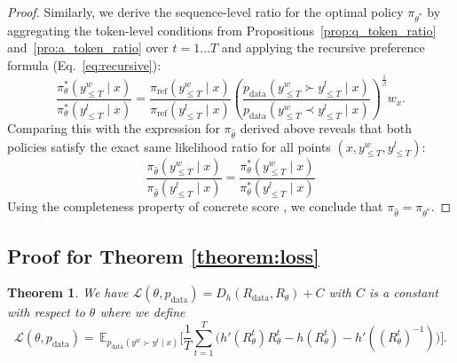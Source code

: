 \documentclass{article}
\theoremstyle{plain}
\newtheorem*{theorem*}{Theorem}
\theoremstyle{definition}
\theoremstyle{remark}
\begin{document}
\begin{proof}
Similarly, we derive the sequence-level ratio for the optimal policy $\pi_{\theta^*}$ by aggregating the token-level conditions from Propositions~\ref{prop:q_token_ratio} and~\ref{pro:a_token_ratio} over $t=1 \dots T$ and applying the recursive preference formula (Eq.~\ref{eq:recursive}):
\begin{equation*}
\frac{
    \pi_{\theta}^{*}\!\left(y_{\leq T}^{w}\mid x\right)
}{
    \pi_{\theta}^{*}\!\left(y_{\leq T}^{l}\mid x\right)
}
=
\frac{
    \pi_{\mathrm{ref}}\!\left(y_{\leq T}^{w}\mid x\right)
}{
    \pi_{\mathrm{ref}}\!\left(y_{\leq T}^{l}\mid x\right)
}
\left(
\frac{
p_{\text{data}}\!\left(y_{\leq T}^{w}\succ y_{\leq T}^{l}\mid x\right)
}{
p_{\text{data}}\!\left(y_{\leq T}^{w}\prec y_{\leq T}^{l}\mid x\right)
}
\right)^{\frac{1}{\beta}}
w_x .
\end{equation*}
Comparing this with the expression for $\pi_{\hat{\theta}}$ derived above reveals that both policies satisfy the exact same likelihood ratio for all points $(x,y^w_{\leq T},y^l_{\leq T})$:
\[
\frac{
   \pi_{\hat{\theta}}\!\left(y_{\leq T}^{w}\mid x\right)
}{
    \pi_{\hat{\theta}}\!\left(y_{\leq T}^{l}\mid x\right)
}
=
\frac{
   \pi_{\theta}^{*}\!\left(y_{\leq T}^{w}\mid x\right)
}{
    \pi_{\theta}^{*}\!\left(y_{\leq T}^{l}\mid x\right)
}
\]
Using the completeness property of concrete score \cite{meng2023concretescorematchinggeneralized}, we conclude that
$\pi_{\hat{\theta}}=\pi_{\theta^\ast}$.
\end{proof}

\subsection{Proof for Theorem \ref{theorem:loss}}
\begin{theorem*}
    We have $\mathcal{L}\left(\theta,p_{\text{data}}\right)=D_{h}\left(R_{\text{data}},R_{\theta}\right)+C$ with $C$ is a constant with respect to $\theta$ where we define
\[
\mathcal{L}\!\left(\theta,p_{\text{data}}\right)
=\,
\mathbb{E}_{p_{\text{data}}\left(y^{w}\succ y^{l}\mid x\right)}\Bigg[
\frac{1}{T}\sum_{t=1}^{T}\Big(
h'\!\left(R_{\theta}^{t}\right)R_{\theta}^{t}
-h\!\left(R_{\theta}^{t}\right)
-h'\!\left(\left(R_{\theta}^{t}\right)^{-1}\right)
\Big)
\Bigg].
\]
\end{theorem*}
\end{document}
